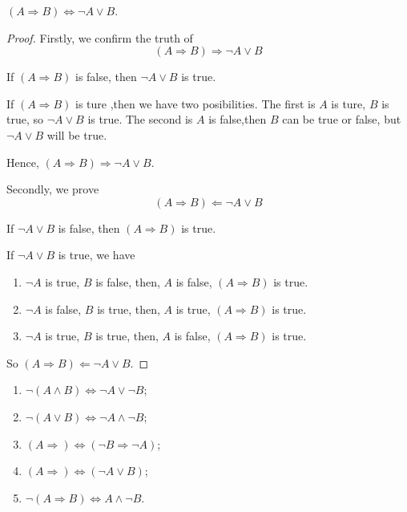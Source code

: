 \begin{question}
    $(A \Rightarrow B)\Leftrightarrow\lnot A \vee B$.
\end{question}
\begin{proof}
    Firstly, we confirm the truth of \[(A \Rightarrow B)\Rightarrow\lnot A \vee B\]

    If $(A \Rightarrow B)$ is false, then $\lnot A \vee B$ is true.

    If $(A \Rightarrow B)$ is ture ,then we have two posibilities. The first is $A$ is ture, $B$ is true, so $\lnot A \vee B$ is true. The second is $A$ is false,then $B$ can be true or false, but $\lnot A \vee B$ will be true.

    Hence, $(A \Rightarrow B)\Rightarrow\lnot A \vee B$.

    Secondly, we prove \[(A \Rightarrow B)\Leftarrow\lnot A \vee B\]

    If $\lnot A \vee B$ is false, then $(A \Rightarrow B)$ is true.

    If $\lnot A \vee B$ is true, we have
    \begin{enumerate}
        \item $\lnot A$ is true, $B$ is false, then, $A$ is false, $(A \Rightarrow B)$ is true.
        \item $\lnot A$ is false, $B$ is true, then, $A$ is true, $(A \Rightarrow B)$ is true.
        \item $\lnot A$ is true, $B$ is true, then, $A$ is false, $(A \Rightarrow B)$ is true.
    \end{enumerate}

    So $(A \Rightarrow B)\Leftarrow\lnot A \vee B$.
\end{proof}

\begin{tips}
    
    \begin{enumerate}
        \item $\lnot(A\wedge B)\Leftrightarrow\lnot A\vee \lnot B$;
        \item $\lnot(A\vee B)\Leftrightarrow\lnot A\wedge \lnot B$;
        \item $(A\Rightarrow)\Leftrightarrow(\lnot B\Rightarrow\lnot A)$;
        \item $(A\Rightarrow)\Leftrightarrow(\lnot A\vee B)$;
        \item $\lnot(A\Rightarrow B)\Leftrightarrow A\wedge\lnot B$.
    \end{enumerate}
\end{tips}